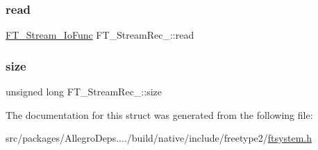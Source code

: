\mbox{\label{struct_f_t___stream_rec___af724049d0258d4988c2b11c3a08b1b05}} 
\subsubsection{\texorpdfstring{read}{read}}
{\footnotesize\ttfamily \hyperlink{ftsystem_8h_a1909d9c00ba62592c047a9868e5a6b0b}{F\+T\+\_\+\+Stream\+\_\+\+Io\+Func} F\+T\+\_\+\+Stream\+Rec\+\_\+\+::read}

\mbox{\label{struct_f_t___stream_rec___ab00e3cf802c950d0ca5a022a06953123}} 
\subsubsection{\texorpdfstring{size}{size}}
{\footnotesize\ttfamily unsigned long F\+T\+\_\+\+Stream\+Rec\+\_\+\+::size}



The documentation for this struct was generated from the following file\+:\begin{DoxyCompactItemize}
\item 
src/packages/\+Allegro\+Deps..../build/native/include/freetype2/\hyperlink{ftsystem_8h}{ftsystem.\+h}\end{DoxyCompactItemize}

